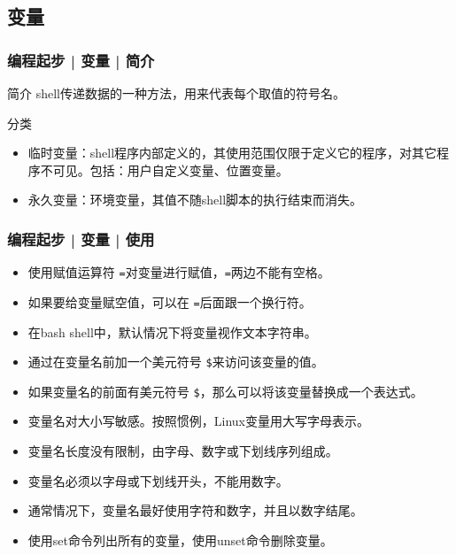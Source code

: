 \subsection{变量}
\begin{frame}
  \frametitle{编程起步 | 变量 | 简介}
  \begin{block}{简介}
    shell传递数据的一种方法，用来代表每个取值的符号名。
  \end{block}
  \pause
  \begin{block}{分类}
    \begin{itemize}
      \item 临时变量：shell程序内部定义的，其使用范围仅限于定义它的程序，对其它程序不可见。包括：用户自定义变量、位置变量。
      \item 永久变量：环境变量，其值不随shell脚本的执行结束而消失。
    \end{itemize}
  \end{block}
\end{frame}

\begin{frame}[fragile]
  \frametitle{编程起步 | 变量 | \alert{使用}}
  \begin{itemize}
    \item 使用赋值运算符 \verb|=|对变量进行赋值，\verb|=|两边不能有空格。
    \item 如果要给变量赋空值，可以在 \verb|=|后面跟一个换行符。
    \item 在bash shell中，默认情况下将变量视作文本字符串。
    \item 通过在变量名前加一个美元符号 \verb|$|来访问该变量的值。
    \item 如果变量名的前面有美元符号 \verb|$|，那么可以将该变量替换成一个表达式。
    \item 变量名对大小写敏感。按照惯例，Linux变量用大写字母表示。
    \item 变量名长度没有限制，由字母、数字或下划线序列组成。
    \item 变量名必须以字母或下划线开头，不能用数字。
    \item 通常情况下，变量名最好使用字符和数字，并且以数字结尾。
    \item 使用set命令列出所有的变量，使用unset命令删除变量。
  \end{itemize}
\end{frame}

